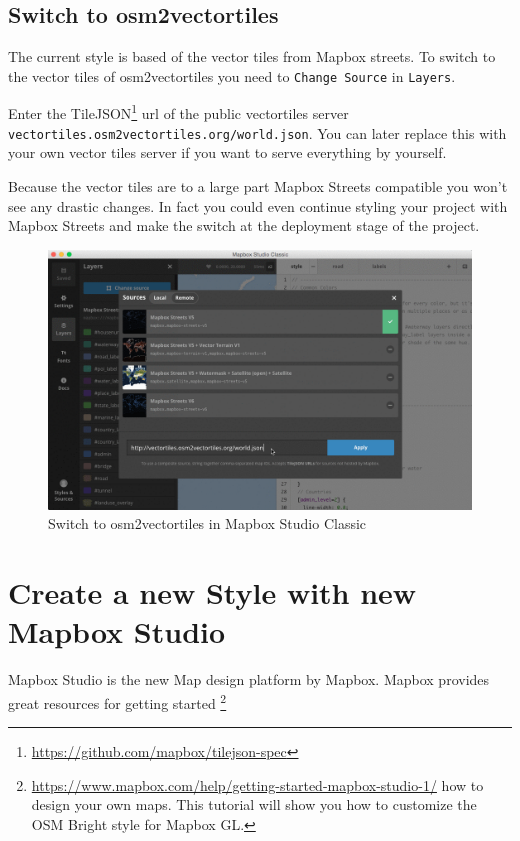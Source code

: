 {\subsection*{Switch to osm2vectortiles}

The current style is based of the vector tiles from Mapbox streets.
To switch to the vector tiles of osm2vectortiles
you need to \texttt{Change\ Source} in \texttt{Layers}.

Enter the TileJSON\footnote{\url{https://github.com/mapbox/tilejson-spec}} url
of the public vectortiles server
\texttt{vectortiles.osm2vectortiles.org/world.json}. You can later
replace this with your own vector tiles server if you want to serve
everything by yourself.

Because the vector tiles are to a large part Mapbox Streets compatible
you won't see any drastic changes. In fact you could even continue
styling your project with Mapbox Streets and make the switch at the
deployment stage of the project.

\begin{figure}[htbp]
\centering
\includegraphics[width=1\textwidth]{images/mapbox_classic_switch_osm2vectortiles.png}
\caption[]{Switch to osm2vectortiles in Mapbox Studio Classic}
\end{figure}


\section*{Create a new Style with new Mapbox
Studio}

Mapbox Studio is the new Map design platform by Mapbox. Mapbox provides
great resources for getting started
\footnote{\url{https://www.mapbox.com/help/getting-started-mapbox-studio-1/}
how to design your own maps. This
tutorial will show you how to customize the OSM Bright style for Mapbox
GL.

}}
